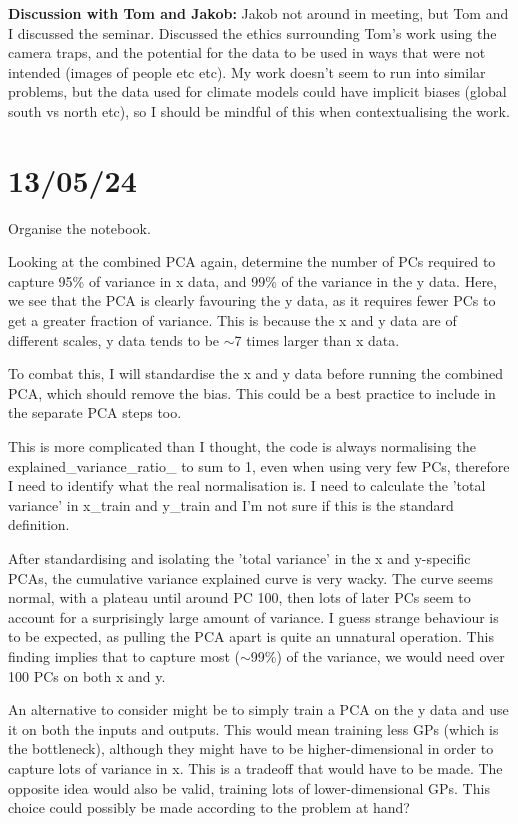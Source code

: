 \documentclass[11pt,a4paper]{article}
\begin{document}
\textbf{Discussion with Tom and Jakob:}
Jakob not around in meeting, but Tom and I discussed the seminar.
Discussed the ethics surrounding Tom's work using the camera traps, and the potential for the data to be used in ways that were not intended (images of people etc etc).
My work doesn't seem to run into similar problems, but the data used for climate models could have implicit biases (global south vs north etc), so I should be mindful of this when contextualising the work.

\section{13/05/24}

Organise the notebook.

Looking at the combined PCA again, determine the number of PCs required to capture 95\% of variance in x data, and 99\% of the variance in the y data.
Here, we see that the PCA is clearly favouring the y data, as it requires fewer PCs to get a greater fraction of variance.
This is because the x and y data are of different scales, y data tends to be $\sim$7 times larger than x data.

To combat this, I will standardise the x and y data before running the combined PCA, which should remove the bias. 
This could be a best practice to include in the separate PCA steps too.

This is more complicated than I thought, the code is always normalising the explained_variance_ratio_ to sum to 1, even when using very few PCs, therefore I need to identify what the real normalisation is.
I need to calculate the 'total variance' in x_train and y_train and I'm not sure if this is the standard definition.

After standardising and isolating the 'total variance' in the x and y-specific PCAs, the cumulative variance explained curve is very wacky.
The curve seems normal, with a plateau until around PC 100, then lots of later PCs seem to account for a surprisingly large amount of variance.
I guess strange behaviour is to be expected, as pulling the PCA apart is quite an unnatural operation.
This finding implies that to capture most ($\sim$99\%) of the variance, we would need over 100 PCs on both x and y.

An alternative to consider might be to simply train a PCA on the y data and use it on both the inputs and outputs.
This would mean training less GPs (which is the bottleneck), although they might have to be higher-dimensional in order to capture lots of variance in x.
This is a tradeoff that would have to be made.
The opposite idea would also be valid, training lots of lower-dimensional GPs.
This choice could possibly be made according to the problem at hand?
\end{document}
